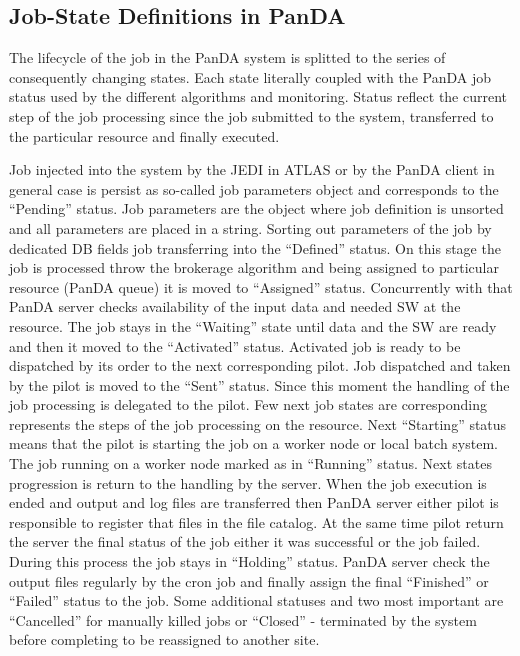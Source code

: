 \subsection{Job-State Definitions in PanDA}
\label{subsec:jobstatedefs}

The lifecycle of the job in the PanDA system is splitted to the series of
consequently changing states. Each state literally coupled with the PanDA job
status used by the different algorithms and monitoring. Status reflect the
current step of the job processing since the job submitted to the system,
transferred to the particular resource and finally executed.

Job injected into the system by the JEDI in ATLAS or by the PanDA client in
general case is persist as so-called job parameters object and corresponds to
the ``Pending'' status. Job parameters are the object where job definition is
unsorted and all parameters are placed in a string. Sorting out parameters of
the job by dedicated DB fields job transferring into the ``Defined'' status. On
this stage the job is processed throw the brokerage algorithm and being
assigned to particular resource (PanDA queue) it is moved to ``Assigned''
status. Concurrently with that PanDA server checks availability of the input
data and needed SW at the resource. The job stays in the ``Waiting'' state
until data and the SW are ready and then it moved to the ``Activated'' status.
Activated job is ready to be dispatched by its order to the next corresponding
pilot. Job dispatched and taken by the pilot is moved to the ``Sent'' status.
Since this moment the handling of the job processing is delegated to the pilot.
Few next job states are corresponding represents the steps of the job
processing on the resource. Next ``Starting'' status means that the pilot is
starting the job on a worker node or local batch system. The job running on a
worker node marked as in ``Running'' status. Next states progression is return
to the handling by the server. When the job execution is ended and output and
log files are transferred then PanDA server either pilot is responsible to
register that files in the file catalog. At the same time pilot return the
server the final status of the job either it was successful or the job failed.
During this process the job stays in ``Holding'' status. PanDA server check the
output files regularly by the cron job and finally assign the final
``Finished'' or ``Failed'' status to the job. Some additional statuses and two
most important are ``Cancelled'' for manually killed jobs or ``Closed'' -
terminated by the system before completing to be reassigned to another site.

